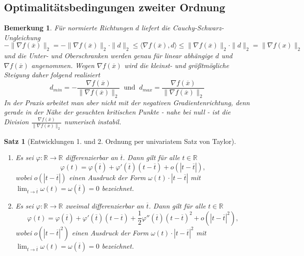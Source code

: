 \documentclass[11pt]{scrreprt}
\newcounter{thm}
\numberwithin{thm}{section}
\newtheorem{satz}[thm]{Satz}
\newtheorem*{bemerkung*}{Bemerkung}
\begin{document}
\subsection*{Optimalitätsbedingungen zweiter Ordnung}

\begin{bemerkung*}
	Für normierte Richtungen $d$ liefert die Cauchy-Schwarz-Ungleichung 
	$$ - \| \nabla f(\overline{x}) \|_2 = -  \| \nabla f(\overline{x}) \|_2 \cdot \| d \|_2 \leq \langle \nabla f(\overline{x}), d \rangle \leq \| \nabla f(\overline{x}) \|_2 \cdot \| d \|_2 = \| \nabla f(x) \|_2 $$
	und die Unter- und Oberschranken werden genau für linear abhängige $d$ und $\nabla f(\overline{x})$ angenommen. Wegen $\nabla f(\overline{x})$ wird die kleinst- und größtmögliche Steigung daher folgend realisiert
	$$ d_{min} = - \frac{\nabla f(\overline{x})}{\| \nabla f(\overline{x}) \|_2} ~\text{ und }~ d_{max} = \frac{\nabla f(\overline{x})}{\| \nabla f(\overline{x}) \|_2}  $$	
	In der Praxis arbeitet man aber nicht mit der negativen Gradientenrichtung, denn gerade in der Nähe der gesuchten kritischen Punkte - nahe bei null - ist die Division $\frac{\nabla f(\overline{x})}{\| \nabla f(\overline{x}) \|_2}$ numerisch instabil.
\end{bemerkung*}

\begin{satz}[Entwicklungen 1. und 2. Ordnung per univariatem Satz von Taylor] ~\
	\begin{enumerate}[label=\alph*\upshape)]
		\item Es sei $\varphi \colon \mathbb{R} \rightarrow \mathbb{R}$ differenzierbar an $\overline{t}$. Dann gilt für alle $t \in \mathbb{R}$
			$$ \varphi(t) = \varphi(\overline{t}) + \varphi'(\overline{t})(t-\overline{t}) + o(|t - \overline{t}|), $$
			wobei $o(|t-\overline{t}|)$ einen Ausdruck der Form $\omega(t) \cdot |t-\overline{t}|$ mit $\lim_{t \rightarrow \overline{t}} \omega(t) = \omega(\overline{t}) = 0$ bezeichnet.
		\item Es sei $\varphi \colon \mathbb{R} \rightarrow \mathbb{R}$ zweimal differenzierbar an $\overline{t}$. Dann gilt für alle $t \in \mathbb{R}$
			$$\varphi(t) = \varphi(\overline{t}) + \varphi'(\overline{t})(t - \overline{t}) + \frac{1}{2} \varphi''(\overline{t})(t-\overline{t})^2 + o(|t-\overline{t}|^2), $$
			wobei $o(|t-\overline{t}|^2)$ einen Ausdruck der Form $\omega(t) \cdot |t-\overline{t}|^2$ mit $\lim_{t \rightarrow \overline{t}} \omega(t) = \omega(\overline{t}) = 0$ bezeichnet.
	\end{enumerate}
\end{satz}
\end{document}
